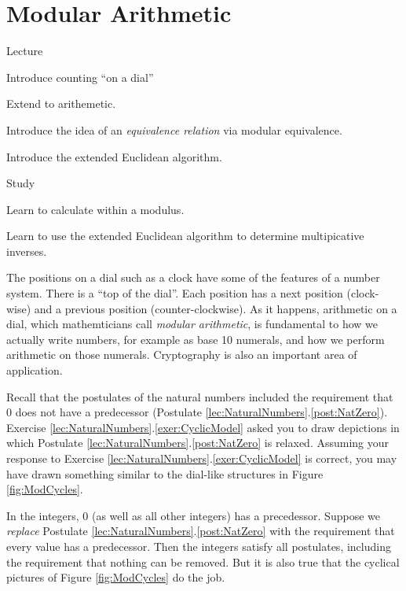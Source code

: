 \chapter{Modular Arithmetic}

\begin{goals} 
	\begin{goal}{Lecture}
		\item Introduce counting ``on a dial''
		\item Extend to arithemetic.
		\item Introduce the idea of an \emph{equivalence relation} via modular equivalence.
		\item Introduce the extended Euclidean algorithm.
	\end{goal}
	
	\begin{goal}{Study}
		\item Learn to calculate within a modulus.
		\item Learn to use the extended Euclidean algorithm to determine multipicative inverses.
	\end{goal}
\end{goals}

The positions on a dial such as a clock have some of the features of a number system. There is a ``top of the dial''. Each position has a next position (clock-wise) and a previous position (counter-clockwise). As it happens, arithmetic on a dial, which mathemticians call \emph{modular arithmetic}, is fundamental to how we actually write numbers, for example as base 10 numerals, and how we perform arithmetic on those numerals. Cryptography is also an important area of application.  
 
Recall that the postulates of the natural numbers included the requirement that $0$ does not have  a predecessor (Postulate \ref{lec:NaturalNumbers}.\ref{post:NatZero}).  Exercise \ref{lec:NaturalNumbers}.\ref{exer:CyclicModel} asked you to draw depictions in which Postulate \ref{lec:NaturalNumbers}.\ref{post:NatZero} is relaxed. 
Assuming your response to Exercise \ref{lec:NaturalNumbers}.\ref{exer:CyclicModel} is correct, you may have drawn something similar to the dial-like structures in Figure \ref{fig:ModCycles}.

In the integers, $0$ (as well as all other integers) has a precedessor. Suppose we \emph{replace} Postulate \ref{lec:NaturalNumbers}.\ref{post:NatZero} with the requirement that every value has a predecessor. 
Then the integers satisfy all postulates, including the requirement that nothing can be removed. But it is also true that the cyclical pictures of Figure \ref{fig:ModCycles} do the job. 

